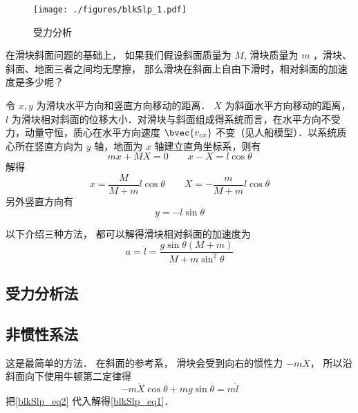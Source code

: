 
\begin{issues}
\issueTODO
\end{issues}


\begin{figure}[ht]
\centering
\texttt{[image: ./figures/blkSlp\_1.pdf]}
\caption{受力分析} \label{blkSlp_fig1}
\end{figure}

在滑块斜面问题的基础上， 如果我们假设斜面质量为 $M$, 滑块质量为 $m$ ，滑块、斜面、地面三者之间均无摩擦， 那么滑块在斜面上自由下滑时，相对斜面的加速度是多少呢？

令 $x, y$ 为滑块水平方向和竖直方向移动的距离． $X$ 为斜面水平方向移动的距离， $l$ 为滑块相对斜面的位移大小．对滑块与斜面组成得系统而言，在水平方向不受力，动量守恒，质心在水平方向速度 $\bvec{v_{cx}}$ 不变（见人船模型）．以系统质心所在竖直方向为 $y$ 轴，地面为 $x$ 轴建立直角坐标系，则有
\begin{equation}
mx+MX=0 \qquad x-X=l\cos\theta
\end{equation}
解得
\begin{equation}\label{blkSlp_eq2}
x = \frac{M}{M + m}l\cos\theta \qquad X = -\frac{m}{M + m}l\cos\theta
\end{equation}
另外竖直方向有
\begin{equation}
y = -l\sin\theta
\end{equation}

以下介绍三种方法， 都可以解得滑块相对斜面的加速度为
\begin{equation}\label{blkSlp_eq1}
a = \ddot l = \frac{g\sin\theta(M+m)}{M + m\sin^2\theta}
\end{equation}

\subsection{受力分析法}

\subsection{非惯性系法}
这是最简单的方法． 在斜面的参考系， 滑块会受到向右的惯性力 $-m\ddot X$， 所以沿斜面向下使用牛顿第二定律得
\begin{equation}
-m\ddot X\cos\theta + mg\sin\theta = m\ddot l
\end{equation}
把\autoref{blkSlp_eq2} 代入解得\autoref{blkSlp_eq1}．


